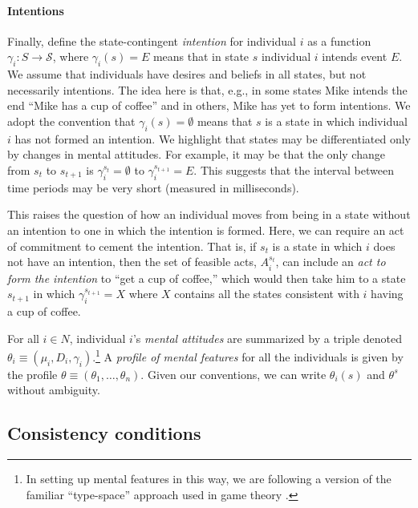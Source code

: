 \documentclass[
11pt,
titlepage,
reqno,
]{article}%
\theoremstyle{definition}
\begin{document}
	\paragraph{Intentions \label{para: intentions}}
	
	Finally, define the state-contingent \textit{intention} for individual $i$ as a function $\gamma_i:S\rightarrow \mathcal{S}$, where $\gamma_i(s)=E$ means that in state $s$ individual $i$ intends event $E$. 
	We assume that individuals have desires and beliefs in all states, but not necessarily intentions. 
	The idea here is that, e.g., in some states Mike intends the end ``Mike has a cup of coffee'' and in others, Mike has yet to form intentions.
	We adopt the convention that $\gamma_i(s)=\emptyset$ means that $s$ is a state in which individual $i$ has not formed an intention. 
	We highlight that states may be differentiated only by changes in mental attitudes. 
	For example, it may be that the only change from $s_t$ to $s_{t+1}$ is $\gamma_i^{s_t}=\emptyset$ to $\gamma_i^{s_{t+1}}=E$.
	This suggests that the interval between time periods may be very short (measured in milliseconds).
	
	This raises the question of how an individual moves from being in a state without an intention to one in which the intention is formed. 
	Here, we can require an act of commitment to cement the intention. 
	That is, if $s_t$ is a state in which $i$ does not have an intention, then the set of feasible acts, $A^{s_t}_i$, can include an \textit{act to form the intention} to ``get a cup of coffee,'' which would then take him to a state $s_{t+1}$ in which $\gamma_i^{s_{t+1}}=X$ where $X$ contains all the states consistent with $i$ having a cup of coffee.
	
	For all $i\in N$, individual $i$'s \textit{mental attitudes} are summarized by a triple denoted $\theta_i\equiv(\mu_i,D_i,\gamma_i)$.\footnote
	{
		In setting up mental features in this way, we are following a version of the familiar ``type-space'' approach used in game theory \citep[See][]{Harsanyi1967, Mertens1985a}. 
	} 
	A \textit{profile of mental features} for all the individuals is given by the profile $\theta\equiv(\theta_1,\ldots,\theta_n)$. 
	Given our conventions, we can write $\theta_i(s)$ and $\theta^s$ without ambiguity.
	
	

	

	\subsection{Consistency conditions\label{sec:consistencies}}
	
\end{document}
